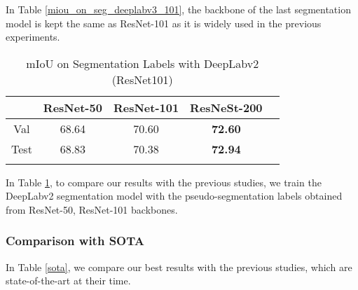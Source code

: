 \documentclass[sn-mathphys]{sn-jnl}
\theoremstyle{thmstyleone}
\theoremstyle{thmstyletwo}\newtheorem{example}{Example}\newtheorem{remark}{Remark}
\theoremstyle{thmstylethree}\newtheorem{definition}{Definition}
\begin{document}
In Table \ref{miou_on_seg_deeplabv3_101}, the backbone of the last segmentation model is kept the same as ResNet-101 as it is widely used in the previous experiments.

\begin{table}[!ht]
    \begin{center}
    \begin{minipage}{\textwidth}
    \caption{mIoU on Segmentation Labels with DeepLabv2 (ResNet101)}\label{miou_on_seg_deeplabv2_101}\begin{tabular*}{\textwidth}{@{\extracolsep{\fill}}ccccc@{\extracolsep{\fill}}}
    \toprule & ResNet-50 & ResNet-101 & ResNeSt-200 \\
    \midrule
    Val & 68.64 & 70.60 & \textbf{72.60	} \\
    Test & 68.83 & 70.38 & \textbf{72.94} \\
    \botrule
    \end{tabular*}
    \end{minipage}
    \end{center}
\end{table}

In Table \ref{miou_on_seg_deeplabv2_101}, to compare our results with the previous studies, we train the DeepLabv2 segmentation model with the pseudo-segmentation labels obtained from ResNet-50, ResNet-101 backbones.


\subsubsection{Comparison with SOTA}\label{comparison_sota}

In Table \ref{sota}, we compare our best results with the previous studies, which are state-of-the-art at their time. 
\end{document}
